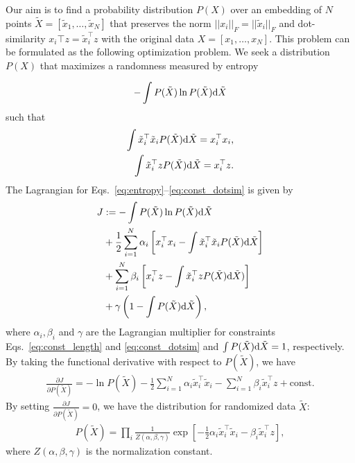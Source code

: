 \documentclass[12pt]{article} %
\begin{document}
Our aim is to find a probability distribution $P(X)$ over an embedding of $N$ points
$\tilde X = [\tilde x_1, \ldots, \tilde x_N]$ that preserves the norm $||x_i||_F = ||\tilde x_i||_F$ and dot-similarity $x_i \top z = \tilde x_i ^\top z$  with the original data $X = [x_1, \ldots, x_N]$. This problem can be formulated as the following optimization problem. We seek a distribution $P(X)$ that maximizes a randomness measured by entropy

\begin{align}
-\int P(\tilde X) \ln P(\tilde X) {\rm d}{\tilde X} \label{eq:entropy}
\end{align}
such that
\begin{align}
\int \tilde x_i ^\top \tilde x_i P(\tilde X){\rm d}\tilde X= x_i ^\top x_i, \label{eq:const_length}\\
\int \tilde x_i ^\top z P(\tilde X){\rm d}\tilde X= x_i ^\top z. \label{eq:const_dotsim}
\end{align}
The Lagrangian for Eqs.~\eqref{eq:entropy}--\eqref{eq:const_dotsim} is given by
\begin{align}
J &:= -\int P(\tilde X) \ln P(\tilde X) {\rm d}{\tilde X} \nonumber \\
  &+ \frac{1}{2}\sum_{i=1}^N \alpha_i \left[ x_i ^\top x_i - \int \tilde x_i ^\top \tilde x_i P(\tilde X){\rm d}\tilde X\right] \nonumber \\
  & + \sum_{i=1}^N \beta_i \left[ x_i ^\top z - \int \tilde x_i ^\top zP(\tilde X){\rm d}\tilde X) \right] \nonumber \\
  &+ \gamma \left(1-\int P(\tilde X){\rm d}\tilde X\right),
\end{align}
where $\alpha_i, \beta_i$ and $\gamma$ are the Lagrangian multiplier for constraints Eqs.~\eqref{eq:const_length} and \eqref{eq:const_dotsim} and $\int P(\tilde X) {\rm d}\tilde X = 1$, respectively.
By taking the functional derivative with respect to $P(\tilde X)$, we have
\begin{align}
\frac{\partial J}{\partial P(\tilde X)} =  -\ln P(\tilde X) - \frac{1}{2}\sum_{i=1}^N \alpha_i \tilde x_i ^\top \tilde x_i  - \sum_{i=1}^N \beta_i \tilde x_i ^\top z + \text{const}.
\end{align}
By setting $\frac{\partial J}{\partial P(\tilde X)} = 0$, we have the distribution for randomized data $\tilde X$:
\begin{align}
P(\tilde X) =\prod_i \frac{1}{Z(\alpha, \beta, \gamma)} \exp\left[-\frac{1}{2}\alpha_i \tilde x_i ^\top \tilde x_i  - \beta_i \tilde x_i ^\top z \right], \label{eq:dist}
\end{align}
where $Z(\alpha, \beta, \gamma)$ is the normalization constant.
\end{document}
